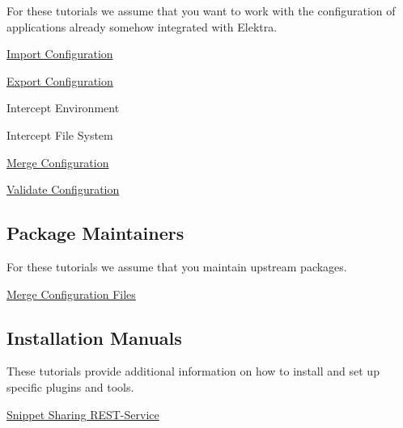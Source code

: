 For these tutorials we assume that you want to work with the configuration of applications already somehow integrated with Elektra.


\begin{DoxyItemize}
\item \hyperlink{doc_tutorials_import_md}{Import Configuration}
\item \hyperlink{doc_tutorials_export_md}{Export Configuration}
\item Intercept Environment
\item Intercept File System
\item \hyperlink{doc_tutorials_merge_md}{Merge Configuration}
\item \hyperlink{md_doc_tutorials_validation_doc_tutorials_validation_md}{Validate Configuration}
\end{DoxyItemize}

\subsection*{Package Maintainers}

For these tutorials we assume that you maintain upstream packages.


\begin{DoxyItemize}
\item \hyperlink{doc_tutorials_elektra-merge-integration_md}{Merge Configuration Files}
\end{DoxyItemize}

\subsection*{Installation Manuals}

These tutorials provide additional information on how to install and set up specific plugins and tools.


\begin{DoxyItemize}
\item \hyperlink{doc_tutorials_snippet-sharing-rest-service_md}{Snippet Sharing R\+E\+S\+T-\/\+Service} 
\end{DoxyItemize}